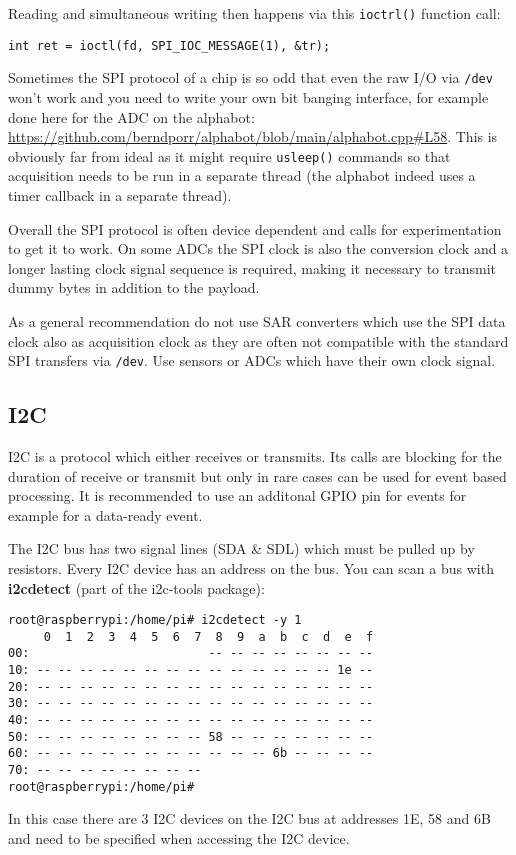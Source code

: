 \documentclass[12pt]{report}
\begin{document}
Reading and simultaneous writing then happens via this \texttt{ioctrl()}
function call:
\begin{verbatim}
int ret = ioctl(fd, SPI_IOC_MESSAGE(1), &tr);
\end{verbatim}

Sometimes the SPI protocol of a chip is so odd that even the raw I/O
via \texttt{/dev} won't work and you need to write your own bit
banging interface, for example done here for the ADC on the alphabot:
\url{https://github.com/berndporr/alphabot/blob/main/alphabot.cpp#L58}.
This is obviously far from ideal as it might require \texttt{usleep()}
commands so that acquisition needs to be run in a separate thread (the
alphabot indeed uses a timer callback in a separate thread).

Overall the SPI protocol is often device dependent and calls
for experimentation to get it to work. On some ADCs the SPI clock is also
the conversion clock and a longer lasting clock signal sequence is required,
making it necessary to transmit dummy bytes in addition to the payload.

As a general recommendation do not use SAR converters which use the
SPI data clock also as acquisition clock as they are often not compatible
with the standard SPI transfers via \texttt{/dev}. Use sensors or ADCs which
have their own clock signal.


\subsection{I2C}
I2C is a protocol which either receives or transmits. Its calls are blocking for the duration of receive or transmit 
but only in rare cases can be used for event based processing. It is recommended to use an additonal GPIO pin for
events for example for a data-ready event.

The I2C bus has two signal lines (SDA \& SDL) which must be pulled up
by resistors. Every I2C device has an address on the bus. You can scan
a bus with \textbf{i2cdetect} (part of the i2c-tools package):
\begin{verbatim}
root@raspberrypi:/home/pi# i2cdetect -y 1
     0  1  2  3  4  5  6  7  8  9  a  b  c  d  e  f
00:                         -- -- -- -- -- -- -- -- 
10: -- -- -- -- -- -- -- -- -- -- -- -- -- -- 1e -- 
20: -- -- -- -- -- -- -- -- -- -- -- -- -- -- -- -- 
30: -- -- -- -- -- -- -- -- -- -- -- -- -- -- -- -- 
40: -- -- -- -- -- -- -- -- -- -- -- -- -- -- -- -- 
50: -- -- -- -- -- -- -- -- 58 -- -- -- -- -- -- -- 
60: -- -- -- -- -- -- -- -- -- -- -- 6b -- -- -- -- 
70: -- -- -- -- -- -- -- --                         
root@raspberrypi:/home/pi# 
\end{verbatim}
In this case there are 3 I2C devices on the I2C bus at addresses
1E, 58 and 6B and need to be specified when
accessing the I2C device.
\end{document}
